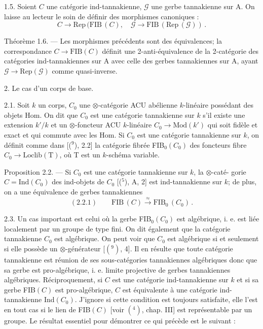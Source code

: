 \documentclass[11pt]{article}
\newcommand{\scanpage}[1]{\par\bigskip\noindent{\small\sffamily[scan #1]}\par}
\newcommand{\mspage}[1]{{\small\sffamily[p.\,#1]}}
\newcommand{\hand}[1]{\textcolor{blue}{#1}}
\begin{document}
1.5. Soient $C$ une catégorie ind-tannakienne, $\mathcal{G}$ une gerbe tannakienne
sur A. On laisse au lecteur le soin de définir des morphismes canoniques :
\[ C \to \mathrm{Rep}\,(\mathrm{FIB}\,(C), \quad \mathcal{G} \to \mathrm{FIB}\,(\mathrm{Rep}\,(\mathcal{G}))\,. \]

Théorème 1.6. --- Les morphismes précédents sont des équivalences; la
correspondance $C \to \mathrm{FIB}(C)$ définit une 2-anti-équivalence de la 2-catégorie
des catégories ind-tannakiennes sur A avec celle des gerbes tannakiennes sur A,
ayant $\mathcal{G} \to \mathrm{Rep}(\mathcal{G})$ comme quasi-inverse.

2. Le cas d'un corps de base.

2.1. Soit $k$ un corps, $C_0$ une $\otimes$-catégorie ACU abélienne $k$-linéaire
possédant des objets Hom. On dit que $C_0$ est une catégorie tannakienne
sur $k$ s'il existe une extension $k'/k$ et un $\otimes$-foncteur ACU $k$-linéaire
$C_0 \to \mathrm{Mod}(k')$ qui soit fidèle et exact et qui commute avec les Hom. Si $C_0$
est une catégorie tannakienne sur $k$, on définit comme dans [(${}^{9}$), 2.2] la
catégorie fibrée FIB$_0(C_0)$ des foncteurs fibre $C_0 \to \mathrm{Loclib}(\mathrm{T})$, où T est un
$k$-schéma variable.

Proposition 2.2. --- Si $C_0$ est une catégorie tannakienne sur $k$, la $\otimes$-caté-%
gorie $C = \mathrm{Ind}(C_0)$ des ind-objets de $C_0$ [(${}^{5}$), A, 2] est ind-tannakienne
sur $k$; de plus, on a une équivalence de gerbes tannakiennes
\[ (2.2.1) \qquad \mathrm{FIB}\,(C) \xrightarrow{\approx} \mathrm{FIB}_0\,(C_0)\,. \]

\mspage{\hand{74}}

\clearpage
\scanpage{119/75}
\mspage{( 3 )}

2.3. Un cas important est celui où la gerbe FIB$_0(C_0)$ est algébrique,
i. e. est liée localement par un groupe de type fini. On dit également que la
catégorie tannakienne $C_0$ est algébrique. On peut voir que $C_0$ est algébrique
si et seulement si elle possède un $\otimes$-générateur [$(^9)$, 4]. Il en résulte que
toute catégorie tannakienne est réunion de ses sous-catégories tannakiennes
algébriques donc que sa gerbe est pro-algébrique, i. e. limite projective de
gerbes tannakiennes algébriques. Réciproquement, si $C$ est une catégorie
ind-tannakienne sur $k$ et si sa gerbe FIB$(C)$ est pro-algébrique, $C$ est
équivalente à une catégorie ind-tannakienne Ind$(C_0)$. J'ignore si cette
condition est toujours satisfaite, elle l'est en tout cas si le lien de FIB$(C)$
[voir $(^4)$, chap. III] est représentable par un groupe. Le résultat essentiel
pour démontrer ce qui précède est le suivant :
\end{document}
